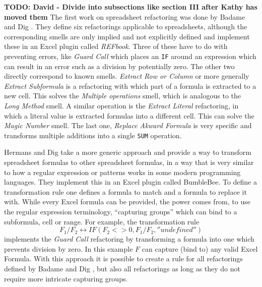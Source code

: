 \documentclass[10pt,conference,compsocconf]{IEEEtran}
\newcommand{\todo}[1]{\textbf{TODO: #1}}
\begin{document}
\todo{David - Divide into subsections like section III after Kathy has moved them}
The first work on spreadsheet refactoring was done by Badame and Dig \cite{badame2012refactoring}.
They define six refactorings applicable to spreadsheets, although the corresponding smells are only implied and not explicitly defined and implement these in an Excel plugin called \textit{REFbook}.
Three of these have to do with preventing errors, like \textit{Guard Call} which places an \texttt{IF} around an expression which can result in an error such as a division by potentially zero.
The other two directly correspond to known smells.
\textit{Extract Row or Column} or more generally \textit{Extract Subformula} is a refactoring with which part of a formula is extracted to a new cell.
This solves the \textit{Multiple operations} smell, which is analogous to the \textit{Long Method} \cite{Hermans2012intra} smell.
A similar operation is the \textit{Extract Literal} refactoring, in which a literal value is extracted formulas into a different cell.
This can solve the \textit{Magic Number} smell.
The last one, \textit{Replace Akward Formula} is very specific and transforms multiple additions into a single \texttt{SUM} operation.

Hermans and Dig \cite{hermans2014bumblebee} take a more generic approach and provide a way to transform spreadsheet formulas to other spreadsheet formulas, in a way that is very similar to how a regular expression or patterns works in some modern programming languages.
They implement this in an Excel plugin called BumbleBee.
To define a transformation rule one defines a formula to match and a formula to replace it with. While every Excel formula can be provided, the power comes from, to use the regular expression terminology, ``capturing groups'' which can bind to a subformula, cell or range. For example, the transformation rule
\[F_1/F_2 \leftrightarrow IF(F_2<>0,F_1/F_2,''undefined'')\]
 implements the \textit{Guard Call} \cite{badame2012refactoring} refactoring by transforming a formula into one which prevents division by zero.
 In this example $F$ can capture (bind to) any valid Excel Formula.
 With this approach it is possible to create a rule for all refactorings defined by Badame and Dig \cite{badame2012refactoring}, but also all refactorings as long as they do not require more intricate capturing groups.
\end{document}
